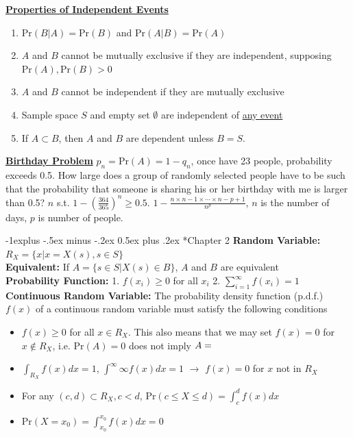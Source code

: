 \documentclass[10pt,landscape]{article}
\makeatletter
\renewcommand{\subsection}{\@startsection{subsection}{2}{0mm}%
                                {-1explus -.5ex minus -.2ex}%
                                {0.5ex plus .2ex}%
                                {\normalfont\normalsize\bfseries}}
\makeatother
\begin{document}
\begin{multicols*}{3}
\textbf{\underline{Properties of Independent Events}} 
\begin{enumerate}[topsep=0pt,noitemsep,wide=0pt, leftmargin=\dimexpr\labelwidth + 2\labelsep\relax]
    \item $\text{Pr}(B|A)=\text{Pr}(B)$ and $\text{Pr}(A|B)=\text{Pr}(A)$
    \item $A$ and $B$ cannot be mutually exclusive if they are independent, supposing $\text{Pr}(A),\text{Pr}(B)>0$
    \item $A$ and $B$ cannot be independent if they are mutually exclusive
    \item Sample space $S$ and empty set $\emptyset$ are independent of \underline{any event}
    \item If $A\subset B$, then $A$ and $B$ are dependent unless $B=S$.
\end{enumerate}

\textbf{\underline{Birthday Problem}}
$p_n=\text{Pr}(A)=1-q_n$, once have 23 people, probability exceeds 0.5.
How large does a group of randomly selected people have to be such that the probability that someone is sharing his or her birthday with me is larger than 0.5? 
$n$ s.t. $1-(\frac{364}{365})^n \geq 0.5$. $1 - \frac{n \times n - 1 \times \cdots  \times n - p + 1}{n^p}$, $n$ is the number of days, $p$ is number of people.

\subsection*{Chapter 2}
\textbf{Random Variable:} $R_X=\{x|x=X(s),s∈S\}$ \\ 
\textbf{Equivalent:} If $A=\{s\in S|X(s)\in B\}$, $A$ and $B$ are equivalent \\
\textbf{Probability Function:} 
1. $f(x_i)≥0$ for all $x_i$
2. $\sum_{i=1}^\infty f(x_i)=1$ \\ 
\textbf{Continuous Random Variable:} The probability density function (p.d.f.) $f(x)$ of a continuous random variable must satisfy the following conditions
\begin{itemize}[topsep=0pt,noitemsep,wide=0pt, leftmargin=\dimexpr{} + 2\relax]
    \item $f(x)≥0$ for all $x\in R_X$. This also means that we may set $f(x)=0$ for $x\notin R_X$, i.e. $\text{Pr}(A)=0$ does not imply $A=\empty$
    \item $\int _{R_X}f(x)dx=1$, $\int^\infty\infty f(x)dx=1$ $\rightarrow$ $f(x)=0$ for $x$ not in $R_X$
    \item For any $(c,d)\subset R_X, c<d$, $\text{Pr}(c≤X≤d)=\int_c^df(x)dx$
    \item $\text{Pr}(X=x_0)=\int_{x_0}^{x_0}f(x)dx=0$
\end{itemize}


\end{multicols*}
\end{document}
